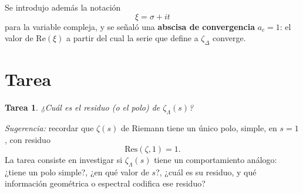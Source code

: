 \documentclass[12pt]{article}
\newtheorem*{tarea}{Tarea}
\begin{document}
Se introdujo además la notación
\[
\xi = \sigma + i t
\]
para la variable compleja, y se señaló una \textbf{abscisa de convergencia} $a_c = 1$: el valor de $\mathrm{Re}(\xi)$ a partir del cual la serie que define a $\zeta_\Delta$ converge.

\section{Tarea}

\begin{tarea}
¿Cuál es el residuo (o el polo) de $\zeta_{\Lambda}(s)$?
\end{tarea}

\noindent \textit{Sugerencia:} recordar que $\zeta(s)$ de Riemann tiene un único polo, simple, en $s=1$, con residuo
\[
\mathrm{Res}(\zeta, 1) = 1.
\]
La tarea consiste en investigar si $\zeta_\Lambda(s)$ tiene un comportamiento análogo: ¿tiene un polo simple?, ¿en qué valor de $s$?, ¿cuál es su residuo, y qué información geométrica o espectral codifica ese residuo?
\end{document}
